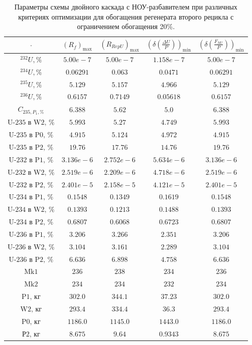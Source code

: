 \begin{table}
\begin{tabular}{ccccc}
    $\cdot$ & $(R_f)_\text{max}$ & $(R_{RepU})_\text{max}$ & $(\delta(\frac{\Delta U}{P}))_\text{min}$ & $(\delta(\frac{F_{NU}}{P}))_\text{min}$\\ \hline
    $^{232}U, \%$ & $5.00e-7$ & $5.00e-7$ & $1.158e-7$ & $5.00e-7$\\ \hline
    $^{234}U, \%$ & $0.06291$ & $0.063$ & $0.0471$ & $0.06291$\\ \hline
    $^{235}U, \%$ & $5.129$ & $5.157$ & $4.966$ & $5.129$\\ \hline
    $^{236}U, \%$ & $0.6157$ & $0.7149$ & $0.05618$ & $0.6157$\\ \hline
    $C_{235,P_1, \%}$ & $6.388$ & $5.62$ & $5.0$ & $6.388$\\ \hline
    $\text{U-235 в W2, \%}$ & $5.993$ & $5.27$ & $4.749$ & $5.993$\\ \hline
    $\text{U-235 в P0, \%}$ & $4.915$ & $5.124$ & $4.972$ & $4.915$\\ \hline
    $\text{U-235 в P2, \%}$ & $19.76$ & $17.76$ & $14.76$ & $19.76$\\ \hline
    $\text{U-232 в P1, \%}$ & $3.136e-6$ & $2.752e-6$ & $5.634e-6$ & $3.136e-6$\\ \hline
    $\text{U-232 в W2, \%}$ & $2.519e-6$ & $2.209e-6$ & $4.718e-6$ & $2.519e-6$\\ \hline
    $\text{U-232 в P2, \%}$ & $2.401e-5$ & $2.158e-5$ & $4.121e-5$ & $2.401e-5$\\ \hline
    $\text{U-234 в P1, \%}$ & $0.1548$ & $0.1349$ & $0.1619$ & $0.1548$\\ \hline
    $\text{U-234 в W2, \%}$ & $0.1393$ & $0.1213$ & $0.1488$ & $0.1393$\\ \hline
    $\text{U-234 в P2, \%}$ & $0.6807$ & $0.6068$ & $0.6723$ & $0.6807$\\ \hline
    $\text{U-236 в P1, \%}$ & $3.206$ & $3.266$ & $2.351$ & $3.206$\\ \hline
    $\text{U-236 в W2, \%}$ & $3.104$ & $3.161$ & $2.289$ & $3.104$\\ \hline
    $\text{U-236 в P2, \%}$ & $6.636$ & $6.898$ & $4.758$ & $6.636$\\ \hline
    $\text{Mk1}$ & $236$ & $238$ & $234$ & $236$\\ \hline
    $\text{Mk2}$ & $234$ & $234$ & $232$ & $234$\\ \hline
    $\text{P1, кг}$ & $302.0$ & $344.1$ & $37.23$ & $302.0$\\ \hline
    $\text{W2, кг}$ & $293.4$ & $334.4$ & $36.3$ & $293.4$\\ \hline
    $\text{P0, кг}$ & $1186.0$ & $1145.0$ & $1443.0$ & $1186.0$\\ \hline
    $\text{Р2, кг}$ & $8.675$ & $9.64$ & $0.9343$ & $8.675$\\ \hline
    \end{tabular}
\caption{Параметры схемы двойного каскада с НОУ-разбавителем при различных критериях оптимизации для обогащения регенерата второго рецикла с ограничением обогащения 20\%.{\label{2opt2_20}}}
\end{table}


